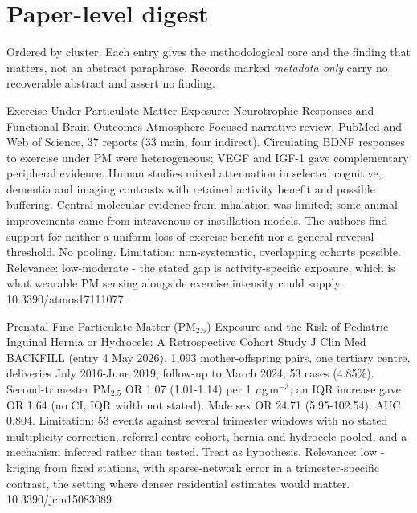 \documentclass[10pt]{article}
\begin{document}
\par{}\baselineskip{}\baselineskip
\section*{\sffamily\bfseries\color{Deep}Paper-level digest}
\vspace{-1.5mm}{\color{Amber}\rule{\linewidth}{1.1pt}}\vspace{2.5mm}

{\fontsize{7.4}{9}\selectfont\color{Slate}Ordered by cluster. Each entry gives the
methodological core and the finding that matters, not an abstract paraphrase. Records
marked \textit{metadata only} carry no recoverable abstract and assert no finding.\par}


{Exercise Under Particulate Matter Exposure: Neurotrophic Responses and Functional Brain Outcomes}
{Atmosphere}
{Focused narrative review, PubMed and Web of Science, 37 reports (33 main, four indirect). Circulating BDNF responses to exercise under PM were heterogeneous; VEGF and IGF-1 gave complementary peripheral evidence. Human studies mixed attenuation in selected cognitive, dementia and imaging contrasts with retained activity benefit and possible buffering. Central molecular evidence from inhalation was limited; some animal improvements came from intravenous or instillation models. The authors find support for neither a uniform loss of exercise benefit nor a general reversal threshold. No pooling. Limitation: non-systematic, overlapping cohorts possible. Relevance: low-moderate - the stated gap is activity-specific exposure, which is what wearable PM sensing alongside exercise intensity could supply.}
{10.3390/atmos17111077}

\par{}\baselineskip{}\baselineskip
{}

{Prenatal Fine Particulate Matter (PM$_{2.5}$) Exposure and the Risk of Pediatric Inguinal Hernia or Hydrocele: A Retrospective Cohort Study}
{J Clin Med}
{BACKFILL (entry 4 May 2026). 1,093 mother-offspring pairs, one tertiary centre, deliveries July 2016-June 2019, follow-up to March 2024; 53 cases (4.85\%). Second-trimester PM$_{2.5}$ OR 1.07 (1.01-1.14) per 1 $\mu$g\,m$^{-3}$; an IQR increase gave OR 1.64 (no CI, IQR width not stated). Male sex OR 24.71 (5.95-102.54). AUC 0.804. Limitation: 53 events against several trimester windows with no stated multiplicity correction, referral-centre cohort, hernia and hydrocele pooled, and a mechanism inferred rather than tested. Treat as hypothesis. Relevance: low - kriging from fixed stations, with sparse-network error in a trimester-specific contrast, the setting where denser residential estimates would matter.}
{10.3390/jcm15083089}
\end{document}
